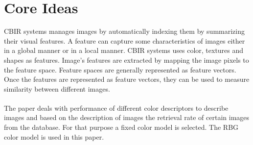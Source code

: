 \documentclass{report}
\begin{document}
\section{Core Ideas}
CBIR systems manages images by automatically indexing them by summarizing their visual features. A feature can capture some characteristics of images either in a global manner or in a local manner. CBIR systems uses color, textures and shapes as features. Image’s features are extracted by mapping the image pixels to the feature space. Feature spaces are generally represented as feature vectors. Once the features are represented as feature vectors, they can be used to measure similarity between different images.\\
\\
The paper deals with performance of different color descriptors to describe images and based on the description of images the retrieval rate of certain images from the database. For that purpose a fixed color model is selected. The RBG color model is used in this paper. 
\end{document}

